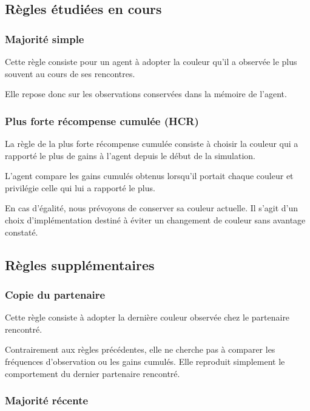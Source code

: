 \documentclass[12pt,a4paper]{article}
\begin{document}
\subsection{Règles étudiées en cours}

\subsubsection{Majorité simple}

Cette règle consiste pour un agent à adopter la couleur qu'il
a observée le plus souvent au cours de ses rencontres.

Elle repose donc sur les observations conservées dans la mémoire
de l'agent.

\subsubsection{Plus forte récompense cumulée (HCR)}

La règle de la plus forte récompense cumulée consiste à choisir
la couleur qui a rapporté le plus de gains à l'agent depuis
le début de la simulation.

L'agent compare les gains cumulés obtenus lorsqu'il portait
chaque couleur et privilégie celle qui lui a rapporté le plus.

En cas d'égalité, nous prévoyons de conserver sa couleur actuelle.
Il s'agit d'un choix d'implémentation destiné à éviter un
changement de couleur sans avantage constaté.

\subsection{Règles supplémentaires}

\subsubsection{Copie du partenaire}

Cette règle consiste à adopter la dernière couleur observée
chez le partenaire rencontré.

Contrairement aux règles précédentes, elle ne cherche pas à
comparer les fréquences d'observation ou les gains cumulés.
Elle reproduit simplement le comportement du dernier partenaire
rencontré.

\subsubsection{Majorité récente}
\end{document}

